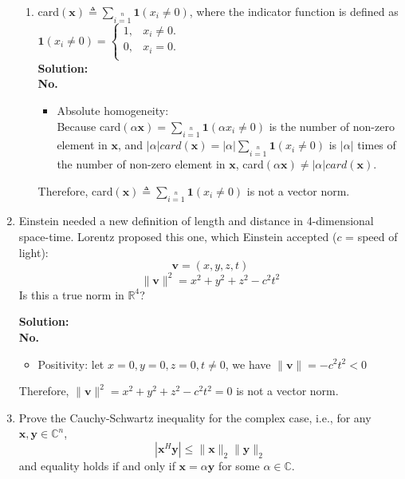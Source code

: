 \documentclass[12pt, letterpaper, onecolumn]{article}
\begin{document}
\begin{enumerate}[start=2]
\begin{enumerate}
			\item card$(\bm{x})\triangleq\sum\limits_{i=1}\limits^{n}{\bm{1}}(x_i\neq0)$, 
			where the indicator function is defined as\\
			$\bm{1}(x_i\neq0)=
				\begin{cases}
					1, & x_i\neq0.\\
					0, & x_i=0.\\
				\end{cases}
			$\\%
			\textbf{Solution:}\\
			\textbf{No.}
			\begin{itemize}
				\item Absolute homogeneity:\\
				Because card$(\alpha\bm{x})=\sum\limits_{i=1}\limits^{n}\bm{1}(\alpha x_{i}\neq 0) $ is the number of non-zero element in $\bm{x}$, and $|\alpha|card(\bm{x})=|\alpha|\sum\limits_{i=1}\limits^{n}\bm{1}(x_{i}\neq 0)$ is $|\alpha|$ times of the number of non-zero element in $\bm{x}$, card$(\alpha \bm{x}) \neq |\alpha|card(\bm{x})$.
			\end{itemize}
			Therefore, card$(\bm{x})\triangleq\sum\limits_{i=1}\limits^{n}{\bm{1}}(x_i\neq0)$ is not a vector norm.

		\end{enumerate}

		\item Einstein needed a new definition of length and distance in 4-dimensional space-time. 
		Lorentz proposed this one, which Einstein accepted ($c$ = speed of light):
		\begin{equation}
			\bm{v}=(x,y,z,t)
		\end{equation}
		\begin{equation}
			\|\bm{v}\|^2=x^2+y^2+z^2-c^2t^2
		\end{equation}
		Is this a true norm in $\mathbb{R}^4$?%

		\textbf{Solution:}\\
		\textbf{No.}
		\begin{itemize}
			\item Positivity: let $x = 0, y = 0, z = 0, t \neq 0$, we have $\| \bm{v} \| = -c^2t^2 < 0$
		\end{itemize}
		Therefore, $\|\bm{v}\|^2=x^2+y^2+z^2-c^2t^2=0$ is not a vector norm.


		\item Prove the Cauchy-Schwartz inequality for the complex case, i.e., 
		for any $\bm{x,y}\in\mathbb{C}^n$,
		$$|\bm{x}^H\bm{y}|\leq\|\bm{x}\|_2\|\bm{y}\|_2$$
		and equality holds if and only if $\bm{x}=\alpha\bm{y}$ for some $\alpha\in\mathbb{C}$.%


\end{enumerate}
\end{document}
